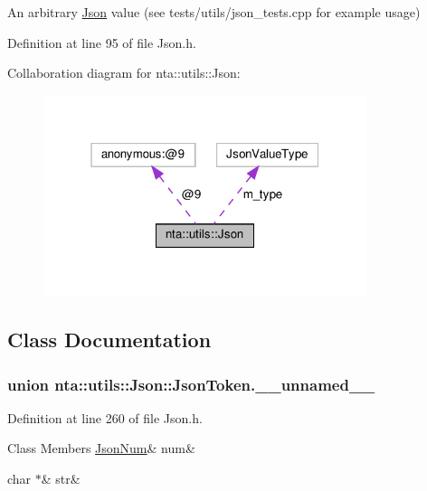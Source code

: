 An arbitrary \hyperlink{classnta_1_1utils_1_1Json}{Json} value (see tests/utils/json\+\_\+tests.\+cpp for example usage) 

Definition at line 95 of file Json.\+h.



Collaboration diagram for nta\+:\+:utils\+:\+:Json\+:\nopagebreak
\begin{figure}[H]
\begin{center}
\leavevmode
\includegraphics[width=268pt]{d2/de6/classnta_1_1utils_1_1Json__coll__graph}
\end{center}
\end{figure}


\subsection{Class Documentation}
\label{unionnta_1_1utils_1_1Json_1_1JsonToken_8____unnamed____}
\subsubsection{union nta\+:\+:utils\+:\+:Json\+:\+:Json\+Token.\+\_\+\+\_\+unnamed\+\_\+\+\_\+}


Definition at line 260 of file Json.\+h.

\begin{DoxyFields}{Class Members}
\mbox{\label{classnta_1_1utils_1_1Json_a0fc3cfbc27e91ea60a787de13dae3e3c}} 
\hyperlink{classnta_1_1utils_1_1JsonNum}{JsonNum}&
num&
\\
\hline

\mbox{\label{classnta_1_1utils_1_1Json_a341be97d9aff90c9978347f66f945b77}} 
char $\ast$&
str&
\\
\hline

\end{DoxyFields}


